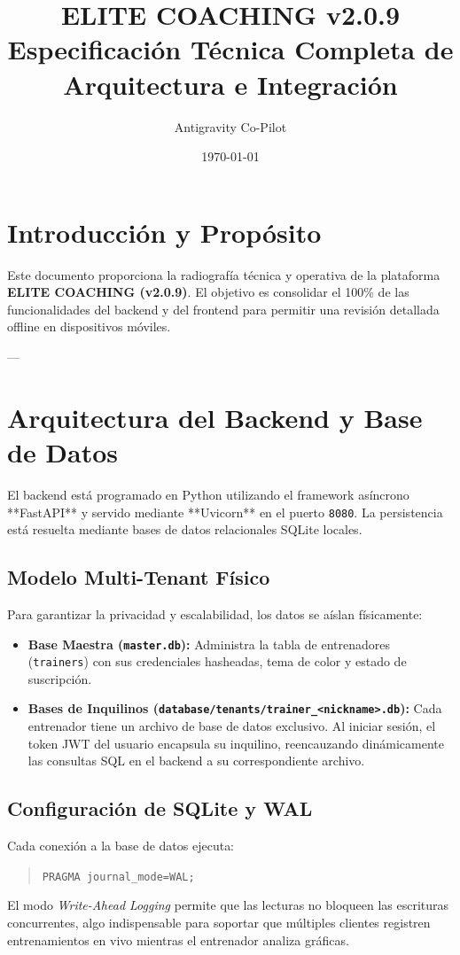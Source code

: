 \documentclass[11pt]{article}
\title{\textbf{\large ELITE COACHING v2.0.9 \\ Especificación Técnica Completa de Arquitectura e Integración}}
\author{\small Antigravity Co-Pilot}
\date{\footnotesize \today}
\begin{document}
\maketitle

\section{Introducción y Propósito}
Este documento proporciona la radiografía técnica y operativa de la plataforma \textbf{ELITE COACHING (v2.0.9)}. El objetivo es consolidar el 100\% de las funcionalidades del backend y del frontend para permitir una revisión detallada offline en dispositivos móviles.

---

\section{Arquitectura del Backend y Base de Datos}
El backend está programado en Python utilizando el framework asíncrono **FastAPI** y servido mediante **Uvicorn** en el puerto \texttt{8080}. La persistencia está resuelta mediante bases de datos relacionales SQLite locales.

\subsection{Modelo Multi-Tenant Físico}
Para garantizar la privacidad y escalabilidad, los datos se aíslan físicamente:
\begin{itemize}
    \item \textbf{Base Maestra (\texttt{master.db}):} Administra la tabla de entrenadores (\texttt{trainers}) con sus credenciales hasheadas, tema de color y estado de suscripción.
    \item \textbf{Bases de Inquilinos (\texttt{database/tenants/trainer\_<nickname>.db}):} Cada entrenador tiene un archivo de base de datos exclusivo. Al iniciar sesión, el token JWT del usuario encapsula su inquilino, reencauzando dinámicamente las consultas SQL en el backend a su correspondiente archivo.
\end{itemize}

\subsection{Configuración de SQLite y WAL}
Cada conexión a la base de datos ejecuta:
\begin{quote}\footnotesize
    \texttt{PRAGMA journal\_mode=WAL;}
\end{quote}
El modo \textit{Write-Ahead Logging} permite que las lecturas no bloqueen las escrituras concurrentes, algo indispensable para soportar que múltiples clientes registren entrenamientos en vivo mientras el entrenador analiza gráficas.
\end{document}
